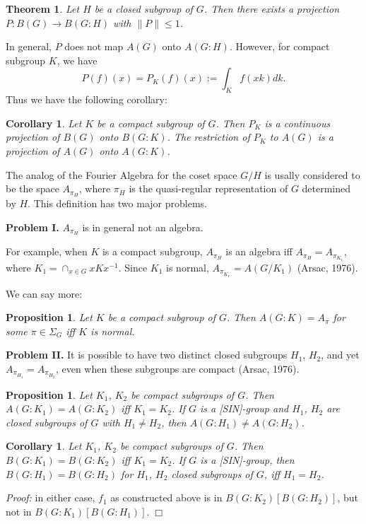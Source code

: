\documentclass[landscape]{slides}
\newtheorem{theorem}[defn]{Theorem}
\newtheorem{prop}[defn]{Proposition}
\newtheorem{cor}[defn]{Corollary}
\begin{document}
\begin{slide}
\begin{theorem}
Let $H$ be a closed subgroup of $G$.  Then there exists a projection
$P:B(G) \rightarrow B(G:H)$ with $\|P\| \leq 1$.
\end{theorem}

In general, $P$ does not map $A(G)$ onto $A(G:H)$.  However, for compact subgroup $K$,
we have
$$
P(f)(x) = P_K (f)(x) := \int_K f(xk) dk.
$$
Thus we have the following corollary:

\begin{cor}\label{3.4}
Let $K$ be a compact subgroup of $G$.  Then $P_K$ is a continuous projection of $B(G)$ onto $B(G:K)$.
The restriction of $P_K$ to $A(G)$ is a projection of $A(G)$ onto $A(G:K)$.
\end{cor}
\end{slide}

\begin{slide}
The analog of the Fourier Algebra for the coset space $G/H$ is usally considered to be
the space $A_{\pi_H}$, where $\pi_H$ is the quasi-regular representation of $G$ determined
by $H$.  This definition has two major problems.

{\bf Problem I.} $A_{\pi_H}$ is in general not an algebra.

For example, when $K$ is a compact subgroup, $A_{\pi_H}$ is an algebra iff $A_{\pi_H} = A_{\pi_{K_1}}$, 
where $K_1 = \cap_{x\in G} xKx^{-1}$.  Since $K_1$ is normal, $A_{\pi_{K_1}} = A(G/K_1)$
(Arsac, 1976).

We can say more:

\begin{prop}
Let $K$ be a compact subgroup of $G$.  Then $A(G:K) = A_\pi$ for some $\pi \in \Sigma_G$ iff $K$
is normal.
\end{prop}

\end{slide}

\begin{slide}
{\bf Problem II.} It is possible to have two distinct closed subgroups $H_1$, $H_2$, and yet
$A_{\pi_{H_1}} = A_{\pi_{H_2}}$, even when these subgroups are compact (Arsac, 1976).

\begin{prop}\label{3.5}
Let $K_1$, $K_2$ be compact subgroups of $G$.  Then $A(G:K_1) = A(G:K_2)$ iff $K_1 = K_2$.
If $G$ is a [SIN]-group and $H_1$, $H_2$ are closed subgroups of $G$ with $H_1 \neq H_2$, then
$A(G:H_1) \neq A(G:H_2)$.
\end{prop}

\begin{cor}
Let $K_1$, $K_2$ be compact subgroups of $G$.  Then $B(G:K_1) = B(G:K_2)$ iff $K_1 = K_2$.  If $G$
is a [SIN]-group, then $B(G:H_1) = B(G:H_2)$ for $H_1$, $H_2$ closed subgroups of $G$, iff $H_1 = H_2$.
\end{cor}
{\it Proof:}
in either case, $f_1$ as constructed above is in $B(G:K_2)$\;$[B(G:H_2)]$,
but not in $B(G:K_1)$\;$[B(G:H_1)].\;\Box$
\end{slide}
\end{document}
